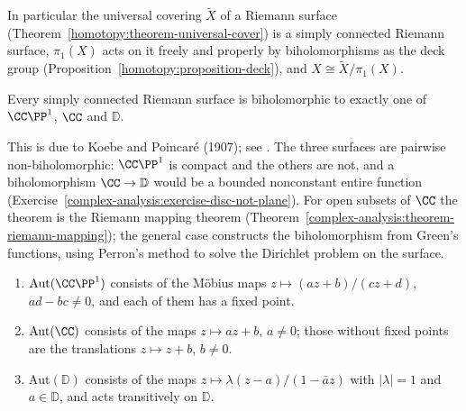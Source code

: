 In particular the universal covering $\widetilde{X}$ of a Riemann surface (Theorem~\ref{homotopy:theorem-universal-cover}) is a simply connected Riemann surface, $\pi_1(X)$ acts
on it freely and properly by biholomorphisms as the deck group (Proposition~\ref{homotopy:proposition-deck}), and $X \cong \widetilde{X}/\pi_1(X)$.

\begin{theorem}\label{complex-manifolds:theorem-uniformisation}
Every simply connected Riemann surface is biholomorphic to exactly one of $\CC\PP^1$, $\CC$ and $\mathbb{D}$.
\end{theorem}

This is due to Koebe and Poincar\'e (1907); see \cite{forster-riemann-surfaces}. The three surfaces are pairwise non-biholomorphic: $\CC\PP^1$ is compact and the others are not,
and a biholomorphism $\CC \to \mathbb{D}$ would be a bounded nonconstant entire function (Exercise~\ref{complex-analysis:exercise-disc-not-plane}). For open subsets of $\CC$ the
theorem is the Riemann mapping theorem (Theorem~\ref{complex-analysis:theorem-riemann-mapping}); the general case constructs the biholomorphism from Green's functions, using
Perron's method to solve the Dirichlet problem on the surface.

\begin{lemma}\label{complex-manifolds:lemma-automorphisms}
\begin{enumerate}
\item $\mathrm{Aut}(\CC\PP^1)$ consists of the M\"obius maps $z \mapsto (az + b)/(cz + d)$, $ad - bc \neq 0$, and each of them has a fixed point.
\item $\mathrm{Aut}(\CC)$ consists of the maps $z \mapsto az + b$, $a \neq 0$; those without fixed points are the translations $z \mapsto z + b$, $b \neq 0$.
\item $\mathrm{Aut}(\mathbb{D})$ consists of the maps $z \mapsto \lambda(z - a)/(1 - \bar az)$ with $|\lambda| = 1$ and $a \in \mathbb{D}$, and acts transitively on $\mathbb{D}$.
\end{enumerate}
\end{lemma}

